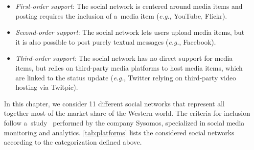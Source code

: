 {\begin{itemize}
  \item \emph{First-order support}:
        The social network is centered around media items
        and posting requires the inclusion of a~media item
        (\emph{e.g.}, YouTube, Flickr).
  \item \emph{Second-order support}:
        The social network lets users upload media items,
        but it is also possible to post purely textual messages
        (\emph{e.g.}, Facebook).
  \item \emph{Third-order support}:
        The social network has no direct support for media items,
        but relies on third-party media platforms
        to host media items, which are linked to the status update
        (\emph{e.g.}, Twitter relying on third-party video hosting via Twitpic).
\end{itemize}

In this chapter, we consider 11 different social networks
that represent all together most of the market share
of the Western world.
The criteria for inclusion follow
a~study~\cite{levine2011howpeopleshare}
performed by the company Sysomos, specialized in social media
monitoring and analytics.
\autoref{tab:platforms} lists the considered social networks according to the categorization defined above.

}
